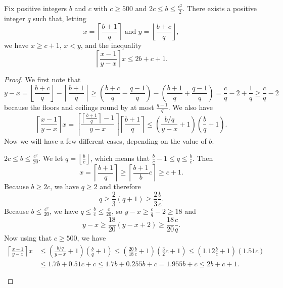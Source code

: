 \documentclass[10pt,a4paper]{amsart}
\begin{document}
\begin{lemma}\label{lem:analysis}
Fix positive integers $b$ and $c$ with $c\geq 500$ and $2c\leq b\leq\frac{c^2}2$. There exists a positive integer $q$ such that, letting
\begin{equation}
x=\left\lceil\frac{b+1}q\right\rceil\text{ and }y=\left\lfloor\frac{b+c}q\right\rfloor,
\end{equation} we have $x\geq c+1$, $x<y$, and the inequality
\begin{equation}
\left\lceil\frac{x-1}{y-x}\right\rceil x\leq 2b+c+1.
\end{equation}
\end{lemma}

\begin{proof}
We first note that
\begin{equation*}
y-x=\left\lfloor\frac{b+c}q\right\rfloor-\left\lceil\frac{b+1}q\right\rceil\geq\left(\frac{b+c}q-\frac{q-1}q\right)-\left(\frac{b+1}q+\frac{q-1}q\right)=\frac cq-2+\frac 1q\geq \frac cq-2
\end{equation*}
because the floors and ceilings round by at most $\frac{q-1}q$. We also have
\begin{equation*}
\left\lceil\frac{x-1}{y-x}\right\rceil x=\left\lceil\frac{\left\lceil\frac{b+1}q\right\rceil-1}{y-x}\right\rceil\left\lceil\frac{b+1}q\right\rceil\leq\left(\frac {b/q}{y-x}+1\right)\left(\frac bq+1\right).
\end{equation*}
Now we will have a few different cases, depending on the value of $b$.

\begin{case} $2c\leq b\leq \frac{c^2}{20}$. We let $q=\left\lfloor\frac bc\right\rfloor$, which means that $\frac bc-1\leq q\leq \frac bc$. Then
\begin{equation*}
x=\left\lceil\frac{b+1}q\right\rceil\geq\left\lceil\frac{b+1}bc\right\rceil\geq c+1.
\end{equation*}
Because $b\geq 2c$, we have $q\geq 2$ and therefore
\begin{equation*}
q\geq\frac 23(q+1)\geq \frac 23\frac bc.
\end{equation*} 
Because $b\leq \frac{c^2}{20}$, we have $q\leq\frac bc\leq\frac c{20}$, so $y-x\geq\frac cq-2\geq 18$ and 
\begin{equation*}
y-x\geq\frac {18}{20}(y-x+2)\geq\frac{18}{20}\frac cq.
\end{equation*}
Now using that $c\geq 500$, we have
\begin{align*}
\left\lceil\frac{x-1}{y-x}\right\rceil x&\leq\left(\frac {b/q}{y-x}+1\right)\left(\frac bq+1\right)\leq\left(\frac{20}{18}\frac bc+1\right)\left(\frac 32c+1\right)\leq(1.12\frac bc+1)(1.51c)\\&\leq 1.7b+0.51c+c\leq 1.7b+0.255b+c=1.955b+c\leq 2b+c+1.
\end{align*}
\end{case}


\end{proof}
\end{document}
